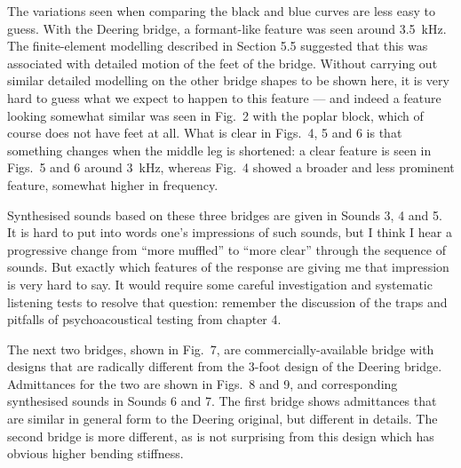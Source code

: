 


  The variations seen when comparing the black and blue curves are less easy to 
  guess. With the Deering bridge, a formant-like feature was seen around 
  3.5~kHz. The finite-element modelling described in Section 5.5 suggested that 
  this was associated with detailed motion of the feet of the bridge. Without 
  carrying out similar detailed modelling on the other bridge shapes to be 
  shown here, it is very hard to guess what we expect to happen to this feature 
  --- and indeed a feature looking somewhat similar was seen in Fig.\ 2 with 
  the poplar block, which of course does not have feet at all. What is clear in 
  Figs.\ 4, 5 and 6 is that something changes when the middle leg is shortened: 
  a clear feature is seen in Figs.\ 5 and 6 around 3~kHz, whereas Fig.\ 4 
  showed a broader and less prominent feature, somewhat higher in frequency. 

  Synthesised sounds based on these three bridges are given in Sounds 3, 4 and 
  5. It is hard to put into words one's impressions of such sounds, but I think 
  I hear a progressive change from ``more muffled'' to ``more clear'' through 
  the sequence of sounds. But exactly which features of the response are giving 
  me that impression is very hard to say. It would require some careful 
  investigation and systematic listening tests to resolve that question: 
  remember the discussion of the traps and pitfalls of psychoacoustical testing 
  from chapter 4. 

\audio{}

\audio{}

\audio{}

  The next two bridges, shown in Fig.\ 7, are commercially-available bridge 
  with designs that are radically different from the 3-foot design of the 
  Deering bridge. Admittances for the two are shown in Figs.\ 8 and 9, and 
  corresponding synthesised sounds in Sounds 6 and 7. The first bridge shows 
  admittances that are similar in general form to the Deering original, but 
  different in details. The second bridge is more different, as is not 
  surprising from this design which has obvious higher bending stiffness. 

